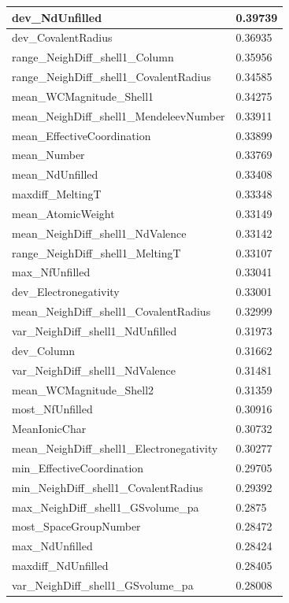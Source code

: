 \begin{longtable}{|l|l|}
dev\_NdUnfilled & 0.39739 \\ \hline
dev\_CovalentRadius & 0.36935 \\ \hline
range\_NeighDiff\_shell1\_Column & 0.35956 \\ \hline
range\_NeighDiff\_shell1\_CovalentRadius & 0.34585 \\ \hline
mean\_WCMagnitude\_Shell1 & 0.34275 \\ \hline
mean\_NeighDiff\_shell1\_MendeleevNumber & 0.33911 \\ \hline
mean\_EffectiveCoordination & 0.33899 \\ \hline
mean\_Number & 0.33769 \\ \hline
mean\_NdUnfilled & 0.33408 \\ \hline
maxdiff\_MeltingT & 0.33348 \\ \hline
mean\_AtomicWeight & 0.33149 \\ \hline
mean\_NeighDiff\_shell1\_NdValence & 0.33142 \\ \hline
range\_NeighDiff\_shell1\_MeltingT & 0.33107 \\ \hline
max\_NfUnfilled & 0.33041 \\ \hline
dev\_Electronegativity & 0.33001 \\ \hline
mean\_NeighDiff\_shell1\_CovalentRadius & 0.32999 \\ \hline
var\_NeighDiff\_shell1\_NdUnfilled & 0.31973 \\ \hline
dev\_Column & 0.31662 \\ \hline
var\_NeighDiff\_shell1\_NdValence & 0.31481 \\ \hline
mean\_WCMagnitude\_Shell2 & 0.31359 \\ \hline
most\_NfUnfilled & 0.30916 \\ \hline
MeanIonicChar & 0.30732 \\ \hline
mean\_NeighDiff\_shell1\_Electronegativity & 0.30277 \\ \hline
min\_EffectiveCoordination & 0.29705 \\ \hline
min\_NeighDiff\_shell1\_CovalentRadius & 0.29392 \\ \hline
max\_NeighDiff\_shell1\_GSvolume\_pa & 0.2875 \\ \hline
most\_SpaceGroupNumber & 0.28472 \\ \hline
max\_NdUnfilled & 0.28424 \\ \hline
maxdiff\_NdUnfilled & 0.28405 \\ \hline
var\_NeighDiff\_shell1\_GSvolume\_pa & 0.28008 \\ \hline

\end{longtable}
